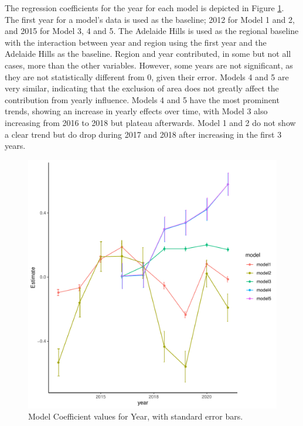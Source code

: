 \documentclass[review,12pt,authoryear]{elsarticle}
\begin{document}
\begin{linenumbers}
\begin{table}[]
{\begin{tabular}{@{}cccccccc@{}}
      \end{tabular}      
  }
\end{table}

The regression coefficients for the year for each model is depicted in Figure \ref{fig:yearly}. The first year for a model's data is used as the baseline; 2012 for Model 1 and 2, and 2015 for Model 3, 4 and 5. The Adelaide Hills is used as the regional baseline with the interaction between year and region using the first year and the Adelaide Hills as the baseline. Region and year contributed, in some but not all cases, more than the other variables. However, some years are not significant, as they are not statistically different from 0, given their error. Models 4 and 5 are very similar, indicating that the exclusion of area does not greatly affect the contribution from yearly influence. Models 4 and 5 have the most prominent trends, showing an increase in yearly effects over time, with Model 3 also increasing from 2016 to 2018 but plateau afterwards. Model 1 and 2 do not show a clear trend but do drop during 2017 and 2018 after increasing in the first 3 years.
\par
\begin{figure}
  \includegraphics{yearly_plots.pdf}
  \caption{Model Coefficient values for Year, with standard error bars.}\label{fig:yearly}
  \end{figure}


\end{linenumbers}
\end{document}

